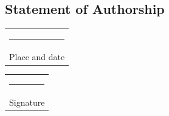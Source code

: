 \documentclass{article}
\begin{document}
\begin{center}
    \section*{Statement of Authorship}
    \thesisauthorship

    \vspace*{4em}\noindent
\hfill%
\begin{tabular}[t]{c}
  \rule{10em}{0.4pt}\\ Place and date
\end{tabular}%
\hfill%
\begin{tabular}[t]{c}
  \rule{10em}{0.4pt}\\ Signature
\end{tabular}%
\hfill\strut
    
\end{center}
\newpage

\begin{center}
	\LARGE
	\thesistitle
\end{center} 
\vspace*{.75cm}
\begin{abstract}
\noindent\thesisabstract
\end{abstract}
\vspace*{.75cm}
\tableofcontents
\newpage
\thispagestyle{empty}
\mbox{}
\newpage
\cleardoublepage





\printbibliography
\end{document}

